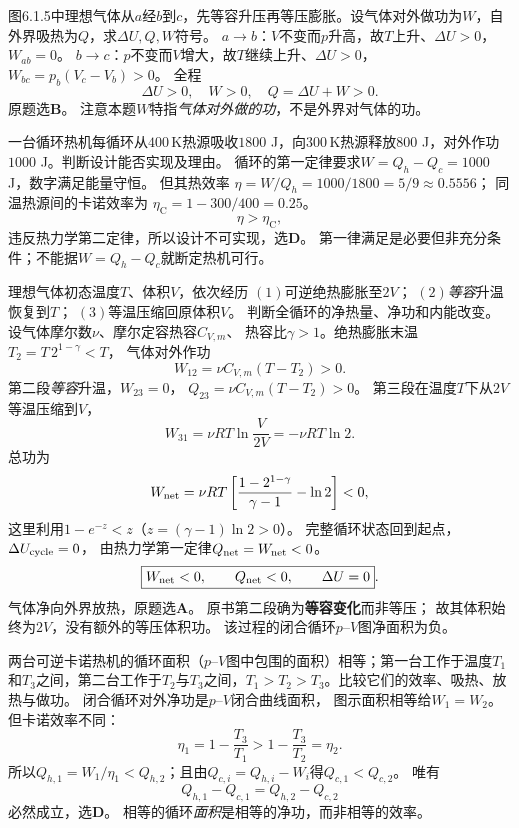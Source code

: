 \problemtext 图6.1.5中理想气体从$a$经$b$到$c$，先等容升压再等压膨胀。设气体对外做功为$W$，自外界吸热为$Q$，求$\Delta U,Q,W$符号。
\workings
$a\to b$：$V$不变而$p$升高，故$T$上升、$\Delta U>0$，$W_{ab}=0$。
$b\to c$：$p$不变而$V$增大，故$T$继续上升、$\Delta U>0$，$W_{bc}=p_b(V_c-V_b)>0$。
全程
\[
\boxed{\Delta U>0,\quad W>0,\quad Q=\Delta U+W>0}.
\]
原题选\textbf{B}。
\crosscheck 注意本题$W$特指\emph{气体对外做的功}，不是外界对气体的功。

\problemtext 一台循环热机每循环从$400\,\mathrm K$热源吸收$1800$ J，向$300\,\mathrm K$热源释放$800$ J，对外作功$1000$ J。判断设计能否实现及理由。
\workings
循环的第一定律要求$W=Q_h-Q_c=1000$ J，数字满足能量守恒。
但其热效率
$\eta=W/Q_h=1000/1800=5/9\approx0.5556$；
同温热源间的卡诺效率为
$\eta_{\mathrm C}=1-300/400=0.25$。
\[
\boxed{\eta>\eta_{\mathrm C}},
\]
违反热力学第二定律，所以设计不可实现，选\textbf{D}。
\crosscheck 第一律满足是必要但非充分条件；不能据$W=Q_h-Q_c$就断定热机可行。

\problemtext 理想气体初态温度$T$、体积$V$，依次经历
$(1)$可逆绝热膨胀至$2V$；
$(2)$\emph{等容}升温恢复到$T$；
$(3)$等温压缩回原体积$V$。
判断全循环的净热量、净功和内能改变。
\workings
设气体摩尔数$\nu$、摩尔定容热容$C_{V,m}$、
热容比$\gamma>1$。绝热膨胀末温
$T_2=T\,2^{1-\gamma}<T$，
气体对外作功
\[
W_{12}=\nu C_{V,m}(T-T_2)>0.
\]
第二段\emph{等容}升温，$W_{23}=0$，
$Q_{23}=\nu C_{V,m}(T-T_2)>0$。
第三段在温度$T$下从$2V$等温压缩到$V$，
\[
W_{31}=\nu RT\ln\frac{V}{2V}=-\nu RT\ln2.
\]
总功为
\[
W_{\rm net}=\nu RT\left[
\frac{1-2^{1-\gamma}}{\gamma-1}-\ln2
\right]<0,
\]
这里利用$1-e^{-z}<z$（$z=(\gamma-1)\ln2>0$）。
完整循环状态回到起点，$\Delta U_{\rm cycle}=0$，
由热力学第一定律$Q_{\rm net}=W_{\rm net}<0$。
\[
\boxed{W_{\rm net}<0,\qquad Q_{\rm net}<0,\qquad \Delta U=0}.
\]
气体净向外界放热，原题选\textbf{A}。
\crosscheck 原书第二段确为\textbf{等容变化}而非等压；
故其体积始终为$2V$，没有额外的等压体积功。
该过程的闭合循环$p$--$V$图净面积为负。

\problemtext 两台可逆卡诺热机的循环面积（$p$--$V$图中包围的面积）相等；第一台工作于温度$T_1$和$T_3$之间，第二台工作于$T_2$与$T_3$之间，$T_1>T_2>T_3$。比较它们的效率、吸热、放热与做功。
\workings
闭合循环对外净功是$p$--$V$闭合曲线面积，
图示面积相等给$W_1=W_2$。
但卡诺效率不同：
\[
\eta_1=1-\frac{T_3}{T_1}>
1-\frac{T_3}{T_2}=\eta_2.
\]
所以$Q_{h,1}=W_1/\eta_1<Q_{h,2}$；且由$Q_{c,i}=Q_{h,i}-W_i$得$Q_{c,1}<Q_{c,2}$。
唯有
\[
\boxed{Q_{h,1}-Q_{c,1}=Q_{h,2}-Q_{c,2}}
\]
必然成立，选\textbf{D}。
\crosscheck 相等的循环\emph{面积}是相等的净功，而非相等的效率。

